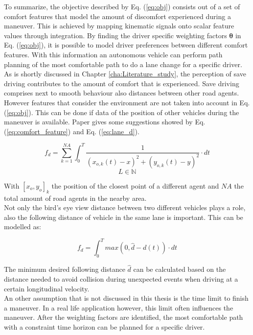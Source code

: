 To summarize, the objective described by Eq. (\ref{eq:obj}) consists out of a set of comfort features that model the amount of discomfort experienced during a maneuver. This is achieved by mapping kinematic signals onto scalar feature values through integration. By finding the driver specific weighting factors $\bm{\theta}$ in Eq. (\ref{eq:obj}), it is possible to model driver preferences between different comfort features. With this information an autonomous vehicle can perform path planning of the most comfortable path to do a lane change for a specific driver.\\

As is shortly discussed in Chapter \ref{cha:Literature_study}, the perception of save driving contributes to the amount of comfort that is experienced. Save driving comprises next to smooth behaviour also distances between other road agents. However features that consider the environment are not taken into account in Eq. (\ref{eq:obj}). This can be done if data of the position of other vehicles during the maneuver is available. Paper \cite{Kuderer2015a} gives some suggestions showed by Eq. (\ref{eq:comfort_feature}) and  Eq. (\ref{eq:lane_d}).  
\newpage

\begin{equation}\label{eq:comfort_feature}
f_d= \sum_{k = 1}^{NA}\int_{0}^{T}\frac{1}{(x_{o,k}(t)-x)^2+(y_{o,k}(t)-y)^2}\cdot dt
\end{equation}
\[L \in \mathbb{N}\]

With $[x_o,y_o]_k$ the position of the closest point of a different agent and $NA$ the total amount of road agents in the nearby area.\\

Not only the bird's eye view distance between two different vehicles plays a role, also the following distance of vehicle in the same lane is important. This can be modelled as:  

\begin{equation}\label{eq:lane_d}
f_d= \int_{0}^{T} max(0,\hat{d}-d(t))\cdot dt
\end{equation}


The minimum desired following distance $\hat{d}$ can be calculated based on the  distance needed to avoid collision during unexpected events when driving at a certain longitudinal velocity. \\

An other assumption that is not discussed in this thesis is the time limit to finish a maneuver. In a real life application however, this limit often influences the maneuver. After the weighting factors are identified, the most comfortable path with a constraint time horizon can be planned for a specific driver. 


